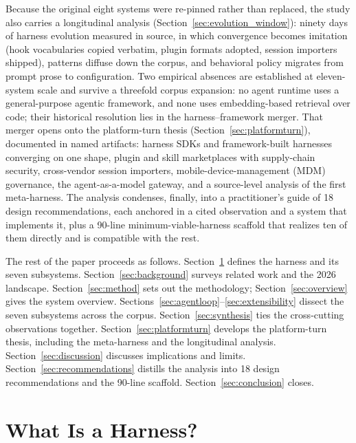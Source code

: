 \documentclass[11pt,a4paper]{article}
\begin{document}
Because the original eight systems were re-pinned rather than replaced, the study also carries a longitudinal analysis (Section~\ref{sec:evolution_window}): ninety days of harness evolution measured in source, in which convergence becomes imitation (hook vocabularies copied verbatim, plugin formats adopted, session importers shipped), patterns diffuse down the corpus, and behavioral policy migrates from prompt prose to configuration.
Two empirical absences are established at eleven-system scale and survive a threefold corpus expansion: no agent runtime uses a general-purpose agentic framework, and none uses embedding-based retrieval over code; their historical resolution lies in the harness--framework merger.
That merger opens onto the platform-turn thesis (Section~\ref{sec:platformturn}), documented in named artifacts: harness SDKs and framework-built harnesses converging on one shape, plugin and skill marketplaces with supply-chain security, cross-vendor session importers, mobile-device-management (MDM) governance, the agent-as-a-model gateway, and a source-level analysis of the first meta-harness.
The analysis condenses, finally, into a practitioner's guide of 18 design recommendations, each anchored in a cited observation and a system that implements it, plus a 90-line minimum-viable-harness scaffold that realizes ten of them directly and is compatible with the rest.

The rest of the paper proceeds as follows.
Section~\ref{sec:whatisaharness} defines the harness and its seven subsystems.
Section~\ref{sec:background} surveys related work and the 2026 landscape.
Section~\ref{sec:method} sets out the methodology; Section~\ref{sec:overview} gives the system overview.
Sections~\ref{sec:agentloop}--\ref{sec:extensibility} dissect the seven subsystems across the corpus.
Section~\ref{sec:synthesis} ties the cross-cutting observations together.
Section~\ref{sec:platformturn} develops the platform-turn thesis, including the meta-harness and the longitudinal analysis.
Section~\ref{sec:discussion} discusses implications and limits.
Section~\ref{sec:recommendations} distills the analysis into 18 design recommendations and the 90-line scaffold.
Section~\ref{sec:conclusion} closes.

\section{What Is a Harness?}
\label{sec:whatisaharness}
\end{document}
